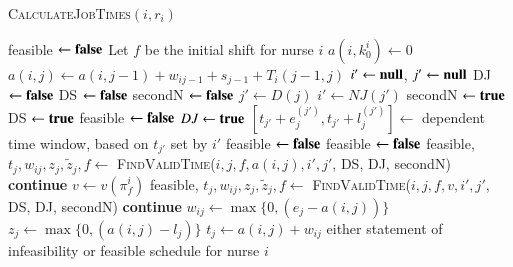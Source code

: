 \documentclass[a4paper,11pt,authoryear]{elsarticle}
\begin{document}
\begin{algorithm}[htbp!]
\scriptsize
\caption{\textsc{CalculateJobTimes}$(i, r_i)$}
\label{alg:cjt}
\begin{algorithmic}[1]
	\State feasible $\gets \textbf{false}$
	\State Let $f$ be the initial shift for nurse $i$
	\State $a(i,k_{0}^i) \gets 0$
		\State $a(i,j) \gets a(i, j-1) + w_{ij-1} + s_{j-1} + T_i(j-1, j)$
		\State $i' \gets \textbf{null}$, $j' \gets \textbf{null}$
		\State DJ $\gets \textbf{false}$
		\State DS $\gets \textbf{false}$
		\State secondN $\gets \textbf{false}$
			\State $j' \gets D(j)$ %
			\State $i' \gets NJ(j')$ %
				\State secondN $\gets \textbf{true}$
			\EndIf
				\State DS $\gets \textbf{true}$
					\State feasible $\gets \textbf{false}$
					\Break
				\EndIf %
			\Else 
				\State $DJ \gets \textbf{true}$
					\State $[t_{j'} + e_j^{(j')}, t_{j'} + l_j^{(j')}] \gets$ dependent time window, based on $t_{j'}$ set by $i'$
						\State feasible $\gets \textbf{false}$
						\Break
							\State feasible $\gets \textbf{false}$
							\Break
						\EndIf
					\EndIf
				\EndIf %
			\EndIf %
		\EndIf %
			\State feasible, $t_j, w_{ij}, z_j, \tilde{z}_j, f \gets$ \textsc{FindValidTime}($i, j, f, a(i,j), i', j'$, DS, DJ, secondN)
				\Break
			\Else \hspace{0.2mm} \textbf{continue}
			\EndIf
			\State $v \gets v(\pi_{f}^{i})$
			\State feasible, $t_j, w_{ij}, z_j, \tilde{z}_j, f \gets$ \textsc{FindValidTime}($i, j, f, v, i', j'$, DS, DJ, secondN)
				\Break
			\Else \hspace{0.2mm} \textbf{continue}
			\EndIf
		\Else
			\State $w_{ij} \gets \max\{0, (e_j-a(i,j))\}$
			\State $z_j \gets \max\{0, (a(i,j) - l_j)\}$
			\State $t_j \gets a(i,j) + w_{ij}$
		\EndIf
	\EndFor
	\Return either statement of infeasibility or feasible schedule for nurse $i$
\end{algorithmic}
\end{algorithm}
\end{document}

